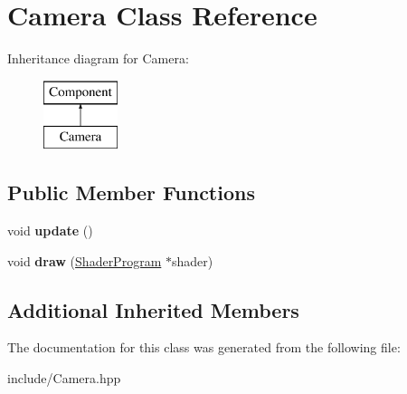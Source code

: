 \hypertarget{class_camera}{\section{Camera Class Reference}
\label{class_camera}
}
Inheritance diagram for Camera\-:\begin{figure}[H]
\begin{center}
\leavevmode
\includegraphics[height=2.000000cm]{class_camera}
\end{center}
\end{figure}
\subsection*{Public Member Functions}
\begin{DoxyCompactItemize}
\item 
\hypertarget{class_camera_a42cda7239981a5618660d04bd5893556}{void {\bfseries update} ()}\label{class_camera_a42cda7239981a5618660d04bd5893556}

\item 
\hypertarget{class_camera_a9530255ef1d7c29628bce345270422fd}{void {\bfseries draw} (\hyperlink{class_shader_program}{Shader\-Program} $\ast$shader)}\label{class_camera_a9530255ef1d7c29628bce345270422fd}

\end{DoxyCompactItemize}
\subsection*{Additional Inherited Members}


The documentation for this class was generated from the following file\-:\begin{DoxyCompactItemize}
\item 
include/Camera.\-hpp\end{DoxyCompactItemize}
